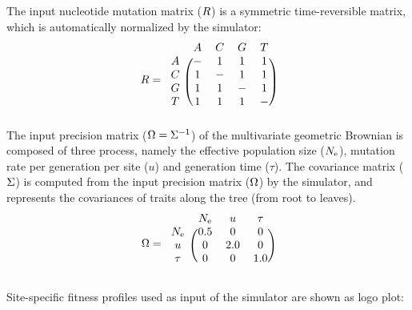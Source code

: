 \documentclass{article}
\begin{document}
	The input nucleotide mutation matrix ($R$) is a symmetric time-reversible matrix, which is automatically normalized by the simulator:
	\begin{equation}
		\Mutmatrix =
		\begin{blockarray}{ccccc}
			& A & C & G & T \\
			\begin{block}{c(cccc)}
				A & - & 1 & 1 & 1 \\
				C & 1 & - & 1 & 1 \\
				G & 1 & 1 & - & 1 \\
				T & 1 & 1 & 1 & - \\
			\end{block}
		\end{blockarray}
	\end{equation}
	The input precision matrix ($\Omega = \Sigma^{-1}$) of the multivariate geometric Brownian is composed of three process, namely the effective population size ($N_{\text{e}}$), mutation rate per generation per site ($u$) and generation time ($\tau$).
	The covariance matrix ($\Sigma$) is computed from the input precision matrix ($\Omega$) by the simulator, and represents the covariances of traits along the tree (from root to leaves).
	\begin{equation}
		\PrecisionMatrix =
		\begin{blockarray}{cccc}
			& \Ne & u & \tau \\
			\begin{block}{c(ccc)}
				\Ne  & 0.5 & 0 & 0 \\
				u    & 0 & 2.0 & 0 \\
				\tau & 0 & 0 & 1.0 \\
			\end{block}
		\end{blockarray}
	\end{equation}

	Site-specific fitness profiles used as input of the simulator are shown as logo plot:

	
	
\end{document}
